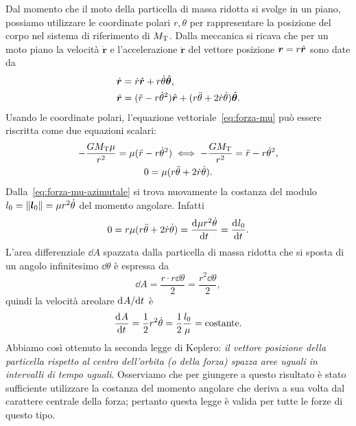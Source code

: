 Dal momento che il moto della particella di massa ridotta si svolge in un piano,
possiamo utilizzare le coordinate polari $r,\theta$ per rappresentare la
posizione del corpo nel sistema di riferimento di $M_\textup{T}$. Dalla
meccanica si ricava che per un moto piano la velocità $\dot{\bm{r}}$ e
l'accelerazione $\ddot{\bm{r}}$ del vettore posizione $\bm{r}=r\hat{\bm{r}}$ sono
date da
\begin{subequations}
  \begin{align}
    \dot{\bm{r}}  &= \dot{r}\hat{\bm{r}} +
    r\dot{\theta}\hat{\bm{\theta}}, \label{eq:velocita-polare}\\
    \ddot{\bm{r}} &= (\ddot{r}-r\dot{\theta}^2)\hat{\bm{r}} + (r\ddot{\theta} +
    2\dot{r}\dot{\theta}) \hat{\bm{\theta}}.
  \end{align}
\end{subequations}
Usando le coordinate polari, l'equazione vettoriale~\eqref{eq:forza-mu} può
essere riscritta come due equazioni scalari:
\begin{subequations}
  \begin{gather}
    -\frac{GM_\textup{T}\mu}{r^2} = \mu(\ddot{r} - r\dot{\theta}^2) \iff
    -\frac{GM_\textup{T}}{r^2}=\ddot{r}-r\dot{\theta}^2,
    \label{eq:forza-mu-radiale}\\
    0 = \mu(r\ddot{\theta} +
    2\dot{r}\dot{\theta}). \label{eq:forza-mu-azimutale}
  \end{gather}
\end{subequations}
Dalla~\eqref{eq:forza-mu-azimutale} si trova nuovamente la costanza del modulo
$l_0 = \lVert\bm{l}_0\rVert = \mu r^2\dot{\theta}$ del momento angolare. Infatti
\begin{equation}
  0 = r\mu(r\ddot{\theta} + 2\dot{r}\dot{\theta}) = \frac{{\mathop{}\!\mathrm{d}^{}}\mu
    r^2\dot{\theta}}{\mathop{}\!\mathrm{d} {t}^{}} = \frac{{\mathop{}\!\mathrm{d}^{}}l_0}{\mathop{}\!\mathrm{d} {t}^{}}.
\end{equation}
L'area differenziale $\dd A$ spazzata dalla particella di massa ridotta che si
sposta di un angolo infinitesimo $\dd\theta$ è espressa da
\begin{equation}
  \dd A = \frac{r\cdot r\dd\theta}{2} = \frac{r^2\dd\theta}{2},
\end{equation}
quindi la velocità areolare $\mathrm{d}^{}A / \mathrm{d} {t}^{}$ è
\begin{equation}
  \label{eq:velocita-areolare}
  \frac{{\mathop{}\!\mathrm{d}^{}}A}{\mathop{}\!\mathrm{d} {t}^{}} = \frac{1}{2}r^2\dot{\theta} = \frac{1}{2}\frac{l_0}{\mu} =
  \text{costante}.
\end{equation}
Abbiamo così ottenuto la seconda legge di Keplero: \emph{il vettore posizione
  della particella rispetto al centro dell'orbita (o della forza) spazza aree
  uguali in intervalli di tempo uguali}. Osserviamo che per giungere a questo
risultato è stato sufficiente utilizzare la costanza del momento angolare che
deriva a sua volta dal carattere centrale della forza; pertanto questa legge
è valida per tutte le forze di questo tipo.

